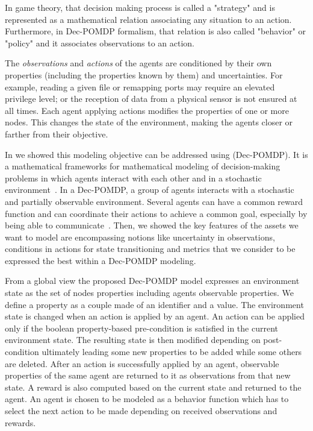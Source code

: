 \documentclass[conference]{IEEEtran}
\begin{document}
In game theory, that decision making process is called a "strategy" and is represented as a mathematical relation associating any situation to an action.
Furthermore, in Dec-POMDP formalism, that relation is also called "behavior" or "policy" and it associates observations to an action.

The \textit{observations} and \textit{actions} of the agents are conditioned by their own properties (including the properties known by them) and uncertainties. For example, reading a given file or remapping ports may require an elevated privilege level; or the reception of data from a physical sensor is not ensured at all times.
Each agent applying actions modifies the properties of one or more nodes. This changes the state of the environment, making the agents closer or farther from their objective.

In \cite{soule2023} we showed this modeling objective can be addressed using  (Dec-POMDP). It is a mathematical frameworks for mathematical modeling of decision-making problems in which agents interact with each other and in a stochastic environment~\cite{beynier2010}. In a Dec-POMDP, a group of agents interacts with a stochastic and partially observable environment. Several agents can have a common reward function and can coordinate their actions to achieve a common goal, especially by being able to communicate~\cite{bernstein2013}.
Then, we showed the key features of the assets we want to model are encompassing notions like uncertainty in observations, conditions in actions for state transitioning and metrics that we consider to be expressed the best within a Dec-POMDP modeling.

From a global view the proposed Dec-POMDP model expresses an environment state as the set of nodes properties including agents observable properties. We define a property as a couple made of an identifier and a value. The environment state is changed when an action is applied by an agent. An action can be applied only if the boolean property-based pre-condition is satisfied in the current environment state. The resulting state is then modified depending on post-condition ultimately leading some new properties to be added while some others are deleted. After an action is successfully applied by an agent, observable properties of the same agent are returned to it as observations from that new state. A reward is also computed based on the current state and returned to the agent. An agent is chosen to be modeled as a behavior function which has to select the next action to be made depending on received observations and rewards.
\end{document}
